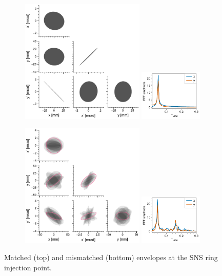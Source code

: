 \begin{figure}[!p]
    \centering
    \begin{subfigure}[t]{\textwidth}
        \includegraphics[width=0.65\textwidth, valign=t]{Images/chapter2/matched_env_SNS.pdf}
        \includegraphics[width=0.33\textwidth, valign=t]{Images/chapter2/matched_env_SNS_fft.pdf}
    \end{subfigure}
    \vfill
    \vspace*{0.6cm}
    \vfill
    \begin{subfigure}[b]{\textwidth}
        \includegraphics[width=0.65\textwidth, valign=t]{Images/chapter2/mismatched_env_SNS.pdf}
        \includegraphics[width=0.33\textwidth, valign=t]{Images/chapter2/mismatched_env_SNS_fft.pdf}
    \end{subfigure}
    \caption{Matched (top) and mismatched (bottom) envelopes at the SNS ring injection point.}
    \label{fig:matched_env_SNS}
\end{figure}
